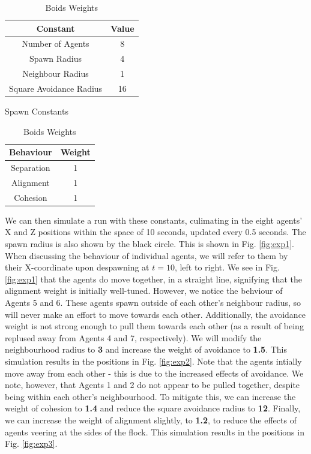 \documentclass{article}
\begin{document}
\begin{table}[h]
    \begin{minipage}{0.45\textwidth}
        \centering
        \begin{tabular}{| c | c |} 
        \hline
        Constant & Value \\ 
        \hline\hline
        Number of Agents & 8 \\
        \hline
        Spawn Radius & 4 \\
        \hline
        Neighbour Radius & 1 \\
        \hline
        Square Avoidance Radius & 16 \\
        \hline
        \end{tabular}
        \caption{Spawn Constants}
        \label{tab:spawn-constants}
    \end{minipage}
    \hfill
    \begin{minipage}{0.45\textwidth}
        \centering
        \begin{tabular}{| c | c |} 
        \hline
        Behaviour & Weight \\ 
        \hline\hline
        Separation & 1 \\
        \hline
        Alignment & 1 \\
        \hline
        Cohesion & 1 \\
        \hline
        \end{tabular}
        \caption{Boids Weights}
        \label{tab:boids-weights}
    \end{minipage}
\end{table}

We can then simulate a run with these constants, culimating in the eight agents' X and Z positions within the space of 10 seconds, updated every 0.5 seconds. The spawn radius is also shown by the black circle. This is shown in Fig. \ref{fig:exp1}. When discussing the behaviour of individual agents, we will refer to them by their X-coordinate upon despawning at $t=10$, left to right. We see in Fig. \ref{fig:exp1} that the agents do move together, in a straight line, signifying that the alignment weight is initially well-tuned. However, we notice the behviour of Agents 5 and 6. These agents spawn outside of each other's neighbour radius, so will never make an effort to move towards each other. Additionally, the avoidance weight is not strong enough to pull them towards each other (as a result of being replused away from Agents 4 and 7, respectively). We will modify the neighbourhood radius to \textbf{3} and increase the weight of avoidance to \textbf{1.5}. This simulation results in the positions in Fig. \ref{fig:exp2}. Note that the agents intially move away from each other - this is due to the increased effects of avoidance. We note, however, that Agents 1 and 2 do not appear to be pulled together, despite being within each other's neighbourhood. To mitigate this, we can increase the weight of cohesion to \textbf{1.4} and reduce the square avoidance radius to \textbf{12}. Finally, we can increase the weight of alignment slightly, to \textbf{1.2}, to reduce the effects of agents veering at the sides of the flock. This simulation results in the positions in Fig. \ref{fig:exp3}.
\end{document}
